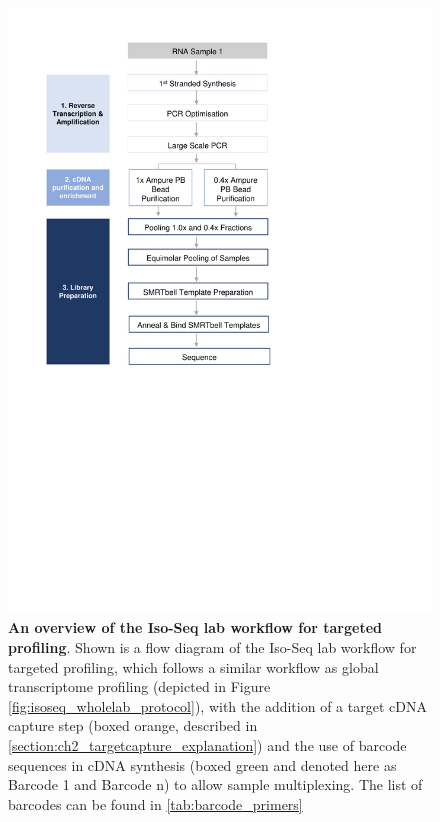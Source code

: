 \begin{figure}[]
	\begin{center}
		\includegraphics[page=2,trim={1cm 11cm 1cm 1cm},clip,scale = 0.8]{Figures/ProjectDevelopment_Figures.pdf}
	\end{center}
	\captionsetup{width=0.95\textwidth}
	\caption[Iso-Seq Lab workflow used for targeted profiling]%
	{\textbf{An overview of the Iso-Seq lab workflow for targeted profiling}. Shown is a flow diagram of the Iso-Seq lab workflow for targeted profiling, which follows a similar workflow as global transcriptome profiling (depicted in Figure \ref{fig:isoseq_wholelab_protocol}), with the addition of a target cDNA capture step (boxed orange, described in \cref{section:ch2_targetcapture_explanation}) and the use of barcode sequences in cDNA synthesis (boxed green and denoted here as Barcode 1 and Barcode n) to allow sample multiplexing. The list of barcodes can be found in \cref{tab:barcode_primers}}
	\label{fig:isoseq_targetedlab_protocol}
\end{figure}

